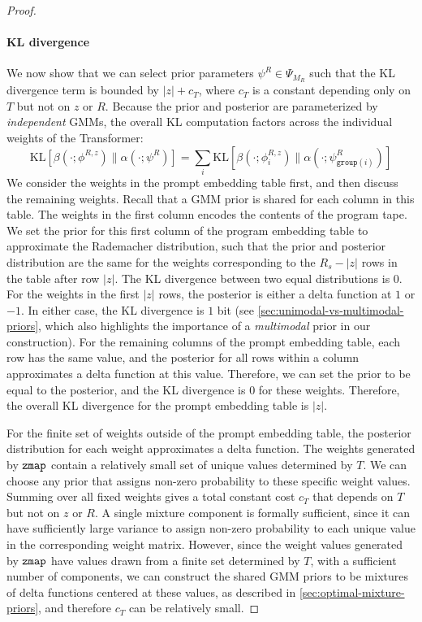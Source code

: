 \begin{proof}
\paragraph{KL divergence}
We now show that we can select prior parameters $\psi^{R} \in \Psi_{M_R}$ such that the KL divergence term is bounded by $|z| + c_T$, where $c_T$ is a constant depending only on $T$ but not on $z$ or $R$. Because the prior and posterior are parameterized by \emph{independent} GMMs, the overall KL computation factors across the individual weights of the Transformer:
\begin{equation}
    \text{KL}\left[ 
    \beta(\cdot;\phi^{R,z}) \parallel 
    \alpha(\cdot;\psi^{R}) \right] = \sum_i \text{KL}\left[  \beta(\cdot;\phi^{R,z}_i)
    \parallel
    \alpha(\cdot;\psi^{R}_{\texttt{group}(i)})
    \right]
\end{equation}
We consider the weights in the prompt embedding table first, and then discuss the remaining weights.
Recall that a GMM prior is shared for each column in this table. The weights in the first column encodes the contents of the program tape. We set the prior for this first column of the program embedding table to approximate the Rademacher distribution, such that the prior and posterior distribution are the same for the weights corresponding to the $R_s - |z|$ rows in the table after row $|z|$. The KL divergence between two equal distributions is $0$. For the weights in the first $|z|$ rows, the posterior is either a delta function at $1$ or $-1$. In either case, the KL divergence is $1$ bit (see \ref{sec:unimodal-vs-multimodal-priors}, which also highlights the importance of a \emph{multimodal} prior in our construction). For the remaining columns of the prompt embedding table, each row has the same value, and the posterior for all rows within a column approximates a delta function at this value. Therefore, we can set the prior to be equal to the posterior, and the KL divergence is $0$ for these weights. Therefore, the overall KL divergence for the prompt embedding table is $|z|$.

For the finite set of weights outside of the prompt embedding table, the posterior distribution for each weight approximates a delta function. The weights generated by $\texttt{zmap}$ contain a relatively small set of unique values determined by $T$. We can choose any prior that assigns non-zero probability to these specific weight values. Summing over all fixed weights gives a total constant cost $c_T$ that depends on $T$ but not on $z$ or $R$. 
A single mixture component is formally sufficient, since it can have sufficiently large variance to assign non-zero probability to each unique value in the corresponding weight matrix. However, since the weight values generated by $\texttt{zmap}$ have values drawn from a finite set determined by $T$, with a sufficient number of components, we can construct the shared GMM priors to be mixtures of delta functions centered at these values, as described in \ref{sec:optimal-mixture-priors}, and therefore $c_T$ can be relatively small.


\end{proof}
